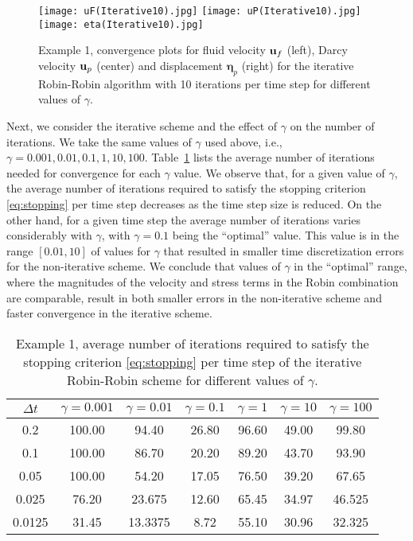 \documentclass[11pt]{article}
\def\u{{\bf u}}
\def\bbeta{\boldsymbol{\eta}}
\begin{document}
\begin{figure}[ht!]
\begin{center}
\texttt{[image: uF(Iterative10).jpg]}
\texttt{[image: uP(Iterative10).jpg]}
\texttt{[image: eta(Iterative10).jpg]}
\end{center}
\caption{Example 1, convergence plots for fluid velocity $\u_f$ (left),  Darcy velocity $\u_p$ (center) and displacement $\bbeta_p$ (right) for the iterative Robin-Robin algorithm with 10 iterations per time step for different values of $\gamma$.}\label{fig:maxiter10}
\end{figure}

Next, we consider the iterative scheme and the effect of $\gamma$ on the number of iterations.
We take the same values of $\gamma$ used above, i.e., $\gamma = 0.001, 0.01,  0.1, 1, 10, 100$.
Table~\ref{tab:iters} lists the average number of iterations needed for convergence for each $\gamma$ value. We observe that, for a given value of $\gamma$, the average number of iterations 
required to satisfy the stopping criterion \eqref{eq:stopping} per time step decreases as the time step size is reduced. On the other hand, for a given time step the average
number of iterations varies considerably with $\gamma$, with $\gamma = 0.1$ being the 
``optimal'' value. This value is in the range $[0.01,10]$ of values for $\gamma$ that resulted in smaller time discretization errors for the non-iterative scheme. We conclude that values of $\gamma$ in the ``optimal'' range, where the magnitudes of the velocity and stress terms in the Robin combination are comparable, result in both smaller errors in the non-iterative scheme and faster convergence in the iterative scheme. 

\begin{table}
\centering{}%
\begin{tabular}{ |c| c c c c c c|}
\hline
$\Delta t$& $\gamma=0.001$ & $\gamma=0.01$ & $\gamma=0.1$ & $\gamma=1$ & $\gamma=10$ & $\gamma=100$\\ 
\hline
0.2 & 100.00 &94.40&26.80 & 96.60 &49.00&99.80 \\  
0.1& 100.00&86.70&20.20 &89.20 &43.70 &93.90  \\
0.05& 100.00&54.20&17.05& 76.50  & 39.20 & 67.65\\
0.025 &76.20&23.675&12.60& 65.45 & 34.97 & 46.525\\
0.0125 &31.45&13.3375&8.72 &55.10 & 30.96 &32.325\\
 \hline
\end{tabular}
\caption{Example 1, average number of iterations 
required to satisfy the stopping criterion \eqref{eq:stopping} per time step of the iterative Robin-Robin scheme for different values of $\gamma$.}\label{tab:iters}
\end{table}
\end{document}
